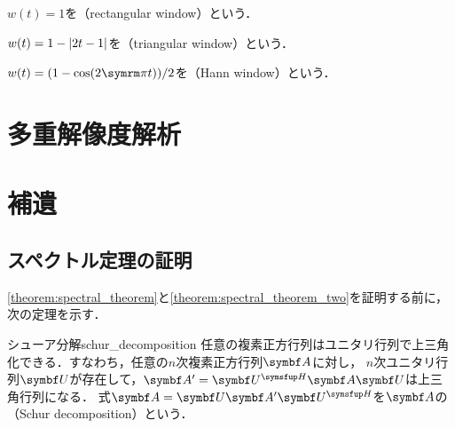 \documentclass[../../main]{subfiles}
\begin{document}
\begin{example}
  \(w(t)=1\)を（rectangular window）という．  
\end{example}

\begin{example}
  \(w(t)=1-\lvert2t-1\rvert\)を（triangular window）という．
\end{example}

\begin{example}
  \(w(t)=(1-\cos(2\krez t))/2\)を（Hann window）という．
\end{example}

\section{多重解像度解析}
\label{section:discrete_mra}

\section{補遺}

\subsection{スペクトル定理の証明}
\label{subsection:proof_of_the_spectral_theorem}

\cref{theorem:spectral_theorem}と\cref{theorem:spectral_theorem_two}を証明する前に，次の定理を示す．

\begin{theorem}{シューア分解}{schur_decomposition}
  任意の複素正方行列はユニタリ行列で上三角化できる．すなわち，任意の\(n\)次複素正方行列\(\mat{A}\)に対し，
  \(n\)次ユニタリ行列\(\mat{U}\)が存在して，\(\mat{A}'=\htrps{\mat{U}}\mat{A}\mat{U}\)は上三角行列\footnotemark になる．
  式\(\mat{A}=\mat{U}\mat{A}'\htrps{\mat{U}}\)を\(\mat{A}\)の（Schur decomposition）という．
\end{theorem}
\end{document}
